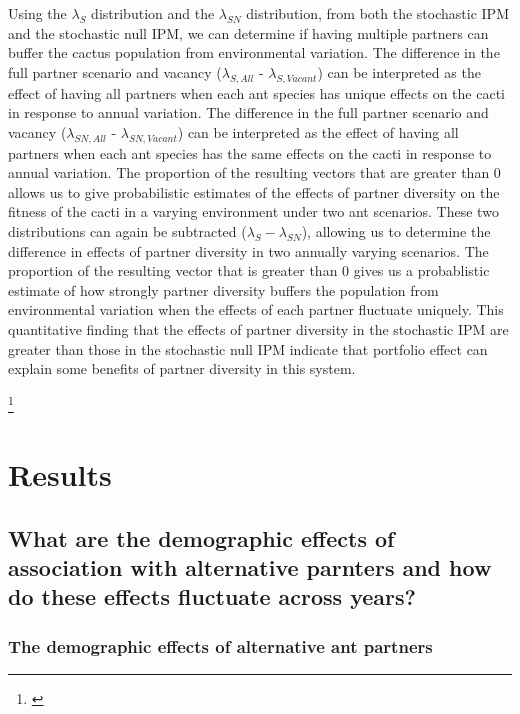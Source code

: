 \documentclass[11pt]{article}
\newcommand{\ali}[2]{{\color{blue}{#1}}\footnote{\textit{\color{blue}{#2}}}}
\begin{document}
Using the $\lambda_S$ distribution and the $\lambda_{SN}$ distribution, from both the stochastic IPM and the stochastic null IPM, we can determine if having multiple partners can buffer the cactus population from environmental variation.
The difference in the full partner scenario and vacancy ($\lambda_{S,All}$ - $\lambda_{S,Vacant}$) can be interpreted as the effect of having all partners when each ant species has unique effects on the cacti in response to annual variation.
The difference in the full partner scenario and vacancy ($\lambda_{SN,All}$ - $\lambda_{SN,Vacant}$) can be interpreted as the effect of having all partners when each ant species has the same effects on the cacti in response to annual variation.
The proportion of the resulting vectors that are greater than 0 allows us to give  probabilistic estimates of the effects of partner diversity on the fitness of the cacti in a varying environment under two ant scenarios.
These two distributions can again be subtracted ($\lambda_{S} - \lambda_{SN}$), allowing us to determine the difference in effects of partner diversity in two annually varying scenarios.
The proportion of the resulting vector that is greater than 0 gives us a probablistic estimate of how strongly partner diversity buffers the population from environmental variation when the effects of each partner fluctuate uniquely.
This quantitative finding that the effects of partner diversity in the stochastic IPM are greater than those in the stochastic null IPM indicate that portfolio effect can explain some benefits of partner diversity in this system.

\ali{}{I focused on several things throughout this rewrite of the methods: I tried to go straight into talking about the stochastic IPM, I focused on explaining rationale for specific numbers better, I tried to update notation to be clearer, and I tried to explain more clearly... not sure if I've accomplished these, let me know}


\section*{Results}
\subsection*{What are the demographic effects of association with alternative parnters and how do these effects fluctuate across years?}
\subsubsection*{The demographic effects of alternative ant partners}
\end{document}

